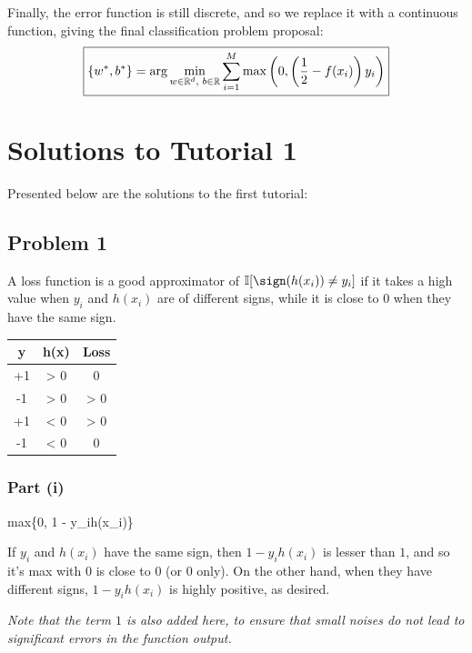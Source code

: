 \documentclass[12pt]{article}
\begin{document}
Finally, the error function is still discrete, and so we replace it with a continuous function, giving the final classification problem proposal: $$\boxed{\{w^*, b^*\} = \arg \min_{w \in \mathbb R^d, \text{ } b \in \mathbb R} \sum_{i = 1}^M \max\left(0, \left(\dfrac{1}{2} - f(x_i) \right)y_i \right)}$$

\section{Solutions to Tutorial 1}
Presented below are the solutions to the first tutorial:

\subsection{Problem 1}

A loss function is a good approximator of $\mathbb{I}[\sign(h(x_i)) \neq y_i]$ if it takes a high value when $y_i$ and $h(x_i)$ are of different signs, while it is close to $0$ when they have the same sign.

\begin{table}
\vspace{-1.5cm}
\begin{tabular}{ccc} \\ \toprule
y & h(x) & Loss \\ \midrule
+1 & > 0 & 0 \\ \midrule
-1 & > 0 & > 0 \\ \midrule
+1 & < 0 & > 0 \\ \midrule
-1 & < 0 & 0 \\ \bottomrule
\end{tabular}
\end{table} 

\subsubsection{Part (i)}
 
      max\{0, 1 - y_i\cdot h(x_i)\}\ \ \ \ \ \ \ \

\vspace{4pt}
        
If $y_i$ and $h(x_i)$ have the same sign, then $1-y_ih(x_i)$ is lesser than $1$, and so it's max with $0$ is close to $0$ (or $0$ only). On the other hand, when they have different signs, $1-y_ih(x_i)$ is highly positive, as desired.

\textit{Note that the term $1$ is also added here, to ensure that small noises do not lead to significant errors in the function output.
}
\end{document}
